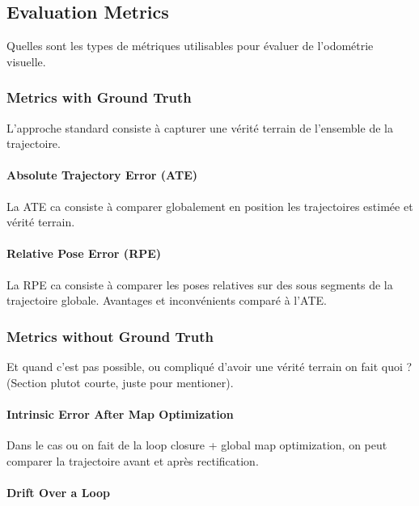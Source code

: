\subsection{Evaluation Metrics}%
\label{sub:metrics}

Quelles sont les types de métriques utilisables pour évaluer de l'odométrie visuelle.

\subsubsection{Metrics with Ground Truth}%
\label{ssub:metrics_gt}

L'approche standard consiste à capturer une vérité terrain de l'ensemble de la trajectoire.

\paragraph{Absolute Trajectory Error (ATE)}%
\label{par:ate}

La ATE ca consiste à comparer globalement en position les trajectoires
estimée et vérité terrain.

\paragraph{Relative Pose Error (RPE)}%
\label{par:rpe}

La RPE ca consiste à comparer les poses relatives sur des sous segments
de la trajectoire globale.
Avantages et inconvénients comparé à l'ATE.

\subsubsection{Metrics without Ground Truth}%
\label{ssub:metrics_no_gt}

Et quand c'est pas possible, ou compliqué d'avoir une vérité terrain
on fait quoi ? (Section plutot courte, juste pour mentioner).

\paragraph{Intrinsic Error After Map Optimization}%
\label{par:map_optim}

Dans le cas ou on fait de la loop closure + global map optimization,
on peut comparer la trajectoire avant et après rectification.

\paragraph{Drift Over a Loop}%
\label{par:drift_loop}

